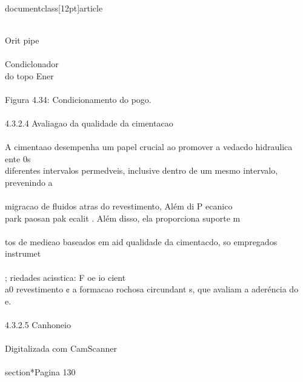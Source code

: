 \\documentclass[12pt]{article}
\begin{document}
\\
Orit pipe\\
\\
Condiclonador\\
do topo Ener\\
\\
Figura 4.34: Condicionamento do pogo.\\
\\
4.3.2.4 Avaliagao da qualidade da cimentacao\\
\\
A cimentaao desempenha um papel crucial ao promover a vedacdo hidraulica ente 0s\\
diferentes intervalos permedveis, inclusive dentro de um mesmo intervalo, prevenindo a\\
\\
migracao de fluidos atras do revestimento, Além di P ecanico\\
park paosan pak ecalit . Além disso, ela proporciona suporte m\\
\\
tos de medi¢ao baseados em aid qualidade da cimentacdo, so empregados instrumet\\
\\
; riedades acisstica: F oe io cient\\
a0 revestimento ¢ a formacao rochosa circundant s, que avaliam a aderéncia do\\
e.\\
\\
4.3.2.5 Canhoneio\\
\\
Digitalizada com CamScanner\\

\\section*{Pagina 130}
\end{document}
